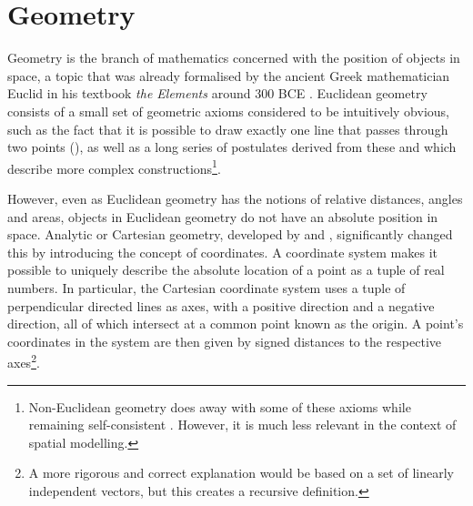 \section{Geometry}
\label{se:geometry}

Geometry is the branch of mathematics concerned with the position of objects in space, a topic that was already formalised by the ancient Greek mathematician Euclid in his textbook \emph{the Elements} around 300 BCE \citep{Fitzpatrick08}.
Euclidean geometry consists of a small set of geometric axioms considered to be intuitively obvious, such as the fact that it is possible to draw exactly one line that passes through two points (), as well as a long series of postulates derived from these and which describe more complex constructions\footnote{Non-Euclidean geometry does away with some of these axioms while remaining self-consistent \citep{Bolyai32,Lobachevsky40}. However, it is much less relevant in the context of spatial modelling.}.

However, even as Euclidean geometry has the notions of relative distances, angles and areas, objects in Euclidean geometry do not have an absolute position in space.
Analytic or Cartesian geometry, developed by \citet{Descartes37} and \citet{de-Fermat79}, significantly changed this by introducing the concept of coordinates.
A coordinate system makes it possible to uniquely describe the absolute location of a point as a tuple of real numbers.
In particular, the Cartesian coordinate system uses a tuple of perpendicular directed lines as axes, with a positive direction and a negative direction, all of which intersect at a common point known as the origin.
A point's coordinates in the system are then given by signed distances to the respective axes\footnote{A more rigorous and correct explanation would be based on a set of linearly independent vectors, but this creates a recursive definition.}.

